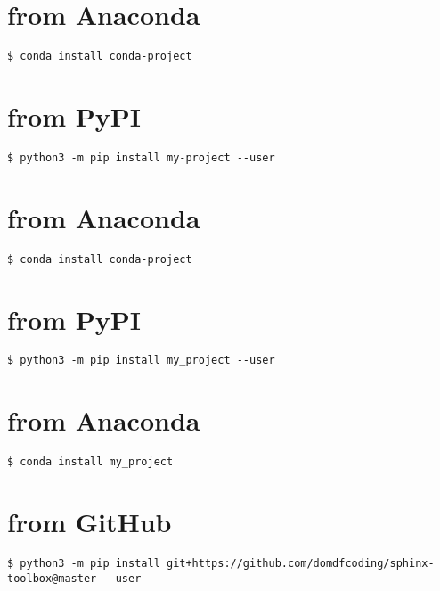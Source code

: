 \documentclass[letterpaper,10pt,english]{sphinxmanual}
\begin{document}
\chapter{from Anaconda}
\label{\detokenize{installation:installation-11-from_Anaconda}}
\begin{Verbatim}[commandchars=\\\{\}]
$ conda install conda-project
\end{Verbatim}


\chapter{from PyPI}
\label{\detokenize{installation:installation-12-from_PyPI}}\label{\detokenize{installation:installation-12}}
\begin{Verbatim}[commandchars=\\\{\}]
$ python3 -m pip install my-project --user
\end{Verbatim}


\chapter{from Anaconda}
\label{\detokenize{installation:installation-12-from_Anaconda}}
\begin{Verbatim}[commandchars=\\\{\}]
$ conda install conda-project
\end{Verbatim}


\chapter{from PyPI}
\label{\detokenize{installation:installation-13-from_PyPI}}\label{\detokenize{installation:installation-13}}
\begin{Verbatim}[commandchars=\\\{\}]
$ python3 -m pip install my_project --user
\end{Verbatim}


\chapter{from Anaconda}
\label{\detokenize{installation:installation-13-from_Anaconda}}
\begin{Verbatim}[commandchars=\\\{\}]
$ conda install my_project
\end{Verbatim}


\chapter{from GitHub}
\label{\detokenize{installation:installation-13-from_GitHub}}
\begin{Verbatim}[commandchars=\\\{\}]
$ python3 -m pip install git+https://github.com/domdfcoding/sphinx-toolbox@master --user
\end{Verbatim}
\end{document}
